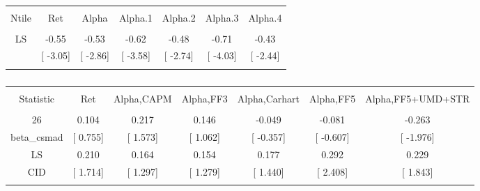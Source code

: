 \documentclass[16pt]{article}
\begin{document}
\begin{table}[!htbp] \centering 
  \caption{} 
  \label{} 
\begin{tabular}{@{\extracolsep{5pt}} ccccccc} 
\\[-1.8ex]\hline 
\hline \\[-1.8ex] 
Ntile & Ret & Alpha & Alpha.1 & Alpha.2 & Alpha.3 & Alpha.4 \\ 
\hline \\[-1.8ex] 
LS & -0.55 & -0.53 & -0.62 & -0.48 & -0.71 & -0.43 \\ 
 & [ -3.05] & [ -2.86] & [ -3.58] & [ -2.74] & [ -4.03] & [ -2.44] \\ 
\hline \\[-1.8ex] 
\end{tabular} 
\end{table}

\begin{table}[!htbp] \centering 
  \caption{} 
  \label{} 
\begin{tabular}{@{\extracolsep{5pt}} ccccccc} 
\\[-1.8ex]\hline 
\hline \\[-1.8ex] 
Statistic & Ret & Alpha,CAPM & Alpha,FF3 & Alpha,Carhart & Alpha,FF5 & Alpha,FF5+UMD+STR \\ 
\hline \\[-1.8ex] 
26 & 0.104 & 0.217 & 0.146 & -0.049 & -0.081 & -0.263 \\ 
beta\_csmad & [ 0.755] & [ 1.573] & [ 1.062] & [ -0.357] & [ -0.607] & [ -1.976] \\ 
LS & 0.210 & 0.164 & 0.154 & 0.177 & 0.292 & 0.229 \\ 
CID & [ 1.714] & [ 1.297] & [ 1.279] & [ 1.440] & [ 2.408] & [ 1.843] \\ 
\hline \\[-1.8ex] 
\end{tabular} 
\end{table}
\end{document}
